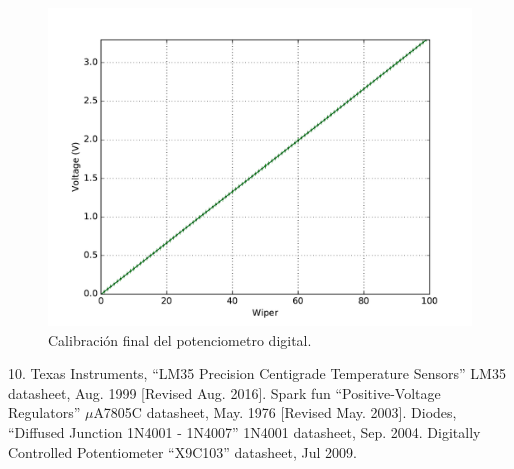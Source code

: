 \documentclass{wileysix}
\begin{document}
\begin{figure}[h]
	\centering
	\includegraphics[width=0.4\linewidth]{extras/final_cal.pdf}
	\caption{Calibraci\'on final del potenciometro digital.}
\end{figure}
\begin{chapreferences}{10.}
	 Texas Instruments, ``LM35 Precision	Centigrade Temperature Sensors'' LM35 datasheet, Aug. 1999 [Revised Aug.
	2016].
	 Spark fun ``Positive-Voltage Regulators'' $\mu$A7805C datasheet, May. 1976 [Revised May. 2003].
	 Diodes, ``Diffused Junction 1N4001 - 1N4007'' 1N4001 datasheet, Sep. 2004.
	Digitally Controlled Potentiometer ``X9C103'' datasheet, Jul 2009.
\end{chapreferences}
\end{document}
